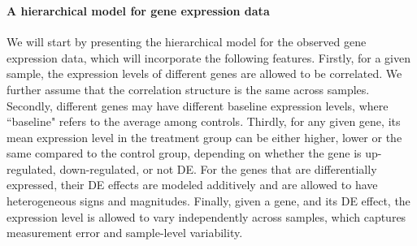 	\subsubsection{\OurMethod}
	\paragraph{A hierarchical model for gene expression data}\label{subsection:YModel}
	We will start by presenting the hierarchical model for the observed gene expression data, which
	will incorporate the following features. Firstly, for a given sample, the expression levels of 
	different genes are allowed to be correlated. We further assume that the correlation structure 
	is the same across samples. Secondly, different genes may have different baseline expression 
	levels, where ``baseline" refers to the	average among controls. Thirdly, for any given gene, 
	its mean expression level in the treatment group can be either higher, lower or the same 
	compared to the control group, depending on whether the gene is up-regulated, down-regulated, 
	or not DE. For the genes that are differentially expressed, their DE effects are modeled 
	additively and are allowed to have heterogeneous signs and magnitudes. Finally, given a gene, 
	and its DE effect, the expression level is allowed to vary independently across samples, which 
	captures measurement error and sample-level variability.
	
